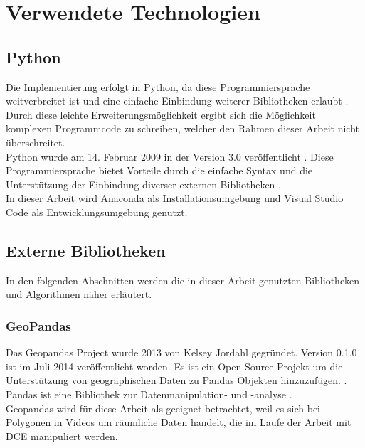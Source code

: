 \chapter{Verwendete Technologien}

\section{Python} 
{  \label{sec:Python}
	Die Implementierung erfolgt in Python, da diese Programmiersprache weitverbreitet ist und eine einfache Einbindung weiterer Bibliotheken erlaubt \citep{Millman2011}. Durch diese leichte Erweiterungsmöglichkeit ergibt sich die Möglichkeit komplexen Programmcode zu schreiben, welcher den Rahmen dieser Arbeit nicht überschreitet. \\
	Python wurde am 14. Februar 2009 in der Version 3.0 veröffentlicht \citep{Rossum2009}. Diese Programmiersprache bietet Vorteile durch die einfache Syntax und die Unterstützung der Einbindung diverser externen Bibliotheken \citep{Marowka2018}. \\
	In dieser Arbeit wird Anaconda als Installationsumgebung und Visual Studio Code als Entwicklungsumgebung genutzt. }

\section{Externe Bibliotheken}
	In den folgenden Abschnitten werden die in dieser Arbeit genutzten Bibliotheken und Algorithmen näher erläutert.
		\subsection{GeoPandas}
		{ \label{subsec:Geopandas}
			Das Geopandas Project wurde 2013 von Kelsey Jordahl gegründet. Version 0.1.0 ist im Juli 2014 veröffentlicht worden. Es ist ein Open-Source Projekt um die Unterstützung von geographischen Daten zu Pandas Objekten hinzuzufügen. \citep{kelsey_jordahl_2020_3946761}. Pandas ist eine Bibliothek zur Datenmanipulation- und -analyse \citep{reback2020pandas}.  \\
			Geopandas wird für diese Arbeit als geeignet betrachtet, weil es sich bei Polygonen in Videos um räumliche Daten handelt, die im Laufe der Arbeit mit DCE manipuliert werden.
		}
